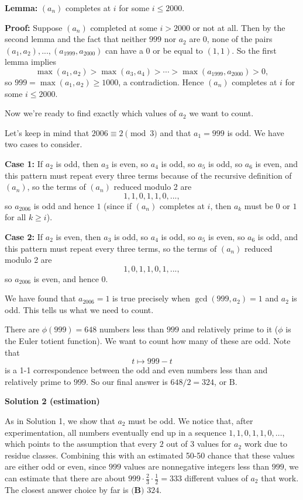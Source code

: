 \begin{enumerate}
 \textbf{Lemma:} $(a_n)$ completes at $i$ for some $i \leq 2000$.

 \textbf{Proof:} Suppose $(a_n)$ completed at some $i > 2000$ or not at all. Then by the second lemma and the fact that neither $999$ nor $a_2$ are $0$, none of the pairs $(a_1, a_2), ..., (a_{1999}, a_{2000})$ can have a $0$ or be equal to $(1, 1)$. So the first lemma implies
 \[\max(a_1, a_2) > \max(a_3, a_4) > \cdots > \max(a_{1999}, a_{2000})  > 0,\]so $999 = \max(a_1, a_2) \geq 1000$, a contradiction. Hence $(a_n)$ completes at $i$ for some $i \leq 2000$.

 
Now we're ready to find exactly which values of $a_2$ we want to count.

 Let's keep in mind that $2006 \equiv 2 \pmod 3$ and that $a_1 = 999$ is odd. We have two cases to consider.

 
\textbf{Case 1:} If $a_2$ is odd, then $a_3$ is even, so $a_4$ is odd, so $a_5$ is odd, so $a_6$ is even, and this pattern must repeat every three terms because of the recursive definition of $(a_n)$, so the terms of $(a_n)$ reduced modulo 2 are
 \[1, 1, 0, 1, 1, 0, ...,\] so $a_{2006}$ is odd and hence $1$ (since if $(a_n)$ completes at $i$, then $a_k$ must be $0$ or $1$ for all $k \geq i$).

 \textbf{Case 2:} If $a_2$ is even, then $a_3$ is odd, so $a_4$ is odd, so $a_5$ is even, so $a_6$ is odd, and this pattern must repeat every three terms, so the terms of $(a_n)$ reduced modulo 2 are 
 \[1, 0, 1, 1, 0, 1, ...,\]so $a_{2006}$ is even, and hence $0$.

 
We have found that $a_{2006} = 1$ is true precisely when $\gcd(999, a_2) = 1$ and $a_2$ is odd. This tells us what we need to count.

 
There are $\phi(999) = 648$ numbers less than $999$ and relatively prime to it ($\phi$ is the Euler totient function). We want to count how many of these are odd. Note that
 \[t \mapsto 999 - t\]is a 1-1 correspondence between the odd and even numbers less than and relatively prime to $999$. So our final answer is $648/2 = 324$, or $\boxed{\text{B}}$.

 



\textbf{Solution 2 (estimation)}

As in Solution 1, we show that $a_2$ must be odd. We notice that, after experimentation, all numbers eventually end up in a sequence $1,1,0,1,1,0,\ldots$, which points to the assumption that every $2$ out of $3$ values for $a_2$ work due to residue classes. Combining this with an estimated 50-50 chance that these values are either odd or even, since $999$ values are nonnegative integers less than $999$, we can estimate that there are about $999\cdot\frac{2}{3}\cdot\frac{1}{2}=333$ different values of $a_2$ that work. The closest answer choice by far is $\boxed{\textbf{(B) }324}$.


\end{enumerate}
